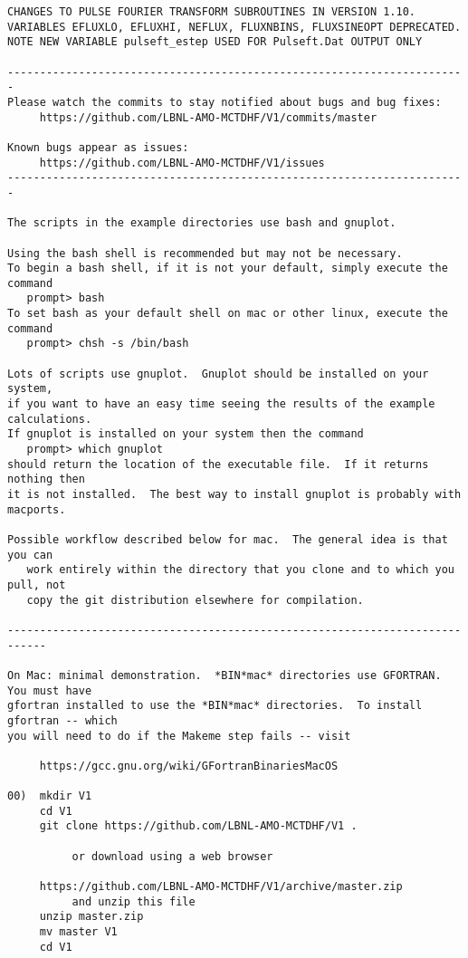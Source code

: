\begin{verbatim}
CHANGES TO PULSE FOURIER TRANSFORM SUBROUTINES IN VERSION 1.10.
VARIABLES EFLUXLO, EFLUXHI, NEFLUX, FLUXNBINS, FLUXSINEOPT DEPRECATED.
NOTE NEW VARIABLE pulseft_estep USED FOR Pulseft.Dat OUTPUT ONLY

-----------------------------------------------------------------------
Please watch the commits to stay notified about bugs and bug fixes:
     https://github.com/LBNL-AMO-MCTDHF/V1/commits/master

Known bugs appear as issues:
     https://github.com/LBNL-AMO-MCTDHF/V1/issues
-----------------------------------------------------------------------

The scripts in the example directories use bash and gnuplot.  

Using the bash shell is recommended but may not be necessary.
To begin a bash shell, if it is not your default, simply execute the command
   prompt> bash
To set bash as your default shell on mac or other linux, execute the command
   prompt> chsh -s /bin/bash

Lots of scripts use gnuplot.  Gnuplot should be installed on your system,
if you want to have an easy time seeing the results of the example calculations.
If gnuplot is installed on your system then the command
   prompt> which gnuplot
should return the location of the executable file.  If it returns nothing then
it is not installed.  The best way to install gnuplot is probably with macports.

Possible workflow described below for mac.  The general idea is that you can 
   work entirely within the directory that you clone and to which you pull, not 
   copy the git distribution elsewhere for compilation.

----------------------------------------------------------------------------

On Mac: minimal demonstration.  *BIN*mac* directories use GFORTRAN.  You must have
gfortran installed to use the *BIN*mac* directories.  To install gfortran -- which
you will need to do if the Makeme step fails -- visit 

     https://gcc.gnu.org/wiki/GFortranBinariesMacOS

00)  mkdir V1
     cd V1
     git clone https://github.com/LBNL-AMO-MCTDHF/V1 .

          or download using a web browser

     https://github.com/LBNL-AMO-MCTDHF/V1/archive/master.zip
          and unzip this file
     unzip master.zip
     mv master V1
     cd V1


\end{verbatim}
